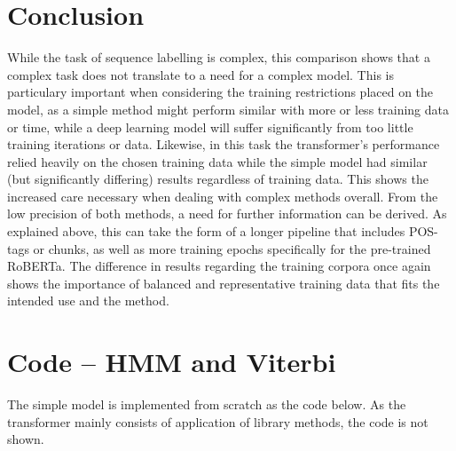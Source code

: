 \documentclass[12pt,pdftex,a4paper]{scrartcl}
\begin{document}
\section{Conclusion}
While the task of sequence labelling is complex, this comparison shows that a complex task does not translate to a need for a complex model. This is particulary important when considering the training restrictions placed on the model, as a simple method might perform similar with more or less training data or time, while a deep learning model will suffer significantly from too little training iterations or data. Likewise, in this task the transformer's performance relied heavily on the chosen training data while the simple model had similar (but significantly differing) results regardless of training data. This shows the increased care necessary when dealing with complex methods overall. From the low precision of both methods, a need for further information can be derived. As explained above, this can take the form of a longer pipeline that includes POS-tags or chunks, as well as more training epochs specifically for the pre-trained RoBERTa. The difference in results regarding the training corpora once again shows the importance of balanced and representative training data that fits the intended use and the method.

\pagebreak
\appendix
\section{Code -- HMM and Viterbi}
The simple model is implemented from scratch as the code below. As the transformer mainly consists of application of library methods, the code is not shown.

\end{document}
